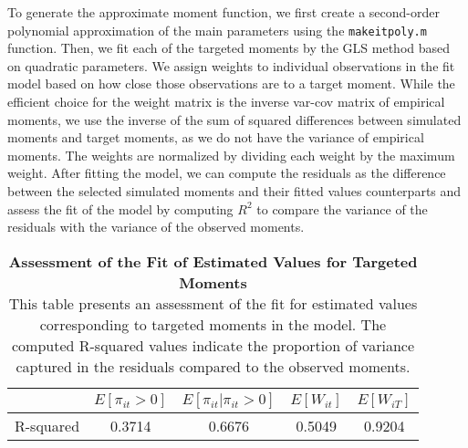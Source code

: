 \documentclass[13pt]{article}
\begin{document}
To generate the approximate moment function, we first create a second-order polynomial approximation of the main parameters using the \texttt{makeitpoly.m} function. Then, we fit each of the targeted moments by the GLS method based on quadratic parameters. We assign weights to individual observations in the fit model based on how close those observations are to a target moment. While the efficient choice for the weight matrix is the inverse var-cov matrix of empirical moments, we use the inverse of the sum of squared differences between simulated moments and target moments, as we do not have the variance of empirical moments. The weights are normalized by dividing each weight by the maximum weight. After fitting the model, we can compute the residuals as the difference between the selected simulated moments and their fitted values counterparts and assess the fit of the model by computing \(R^2\) to compare the variance of the residuals with the variance of the observed moments.
\begin{table}[!htbp]
    \centering
    \caption{\textbf{Assessment of the Fit of Estimated Values for Targeted Moments}\\
    \small{
    This table presents an assessment of the fit for estimated values corresponding to targeted moments in the model. The computed R-squared values indicate the proportion of variance captured in the residuals compared to the observed moments.
    }
    }
    \begin{tabular}{lcccc}
        \hline
        & $E[\pi_{it} > 0]$ & $E[\pi_{it}|\pi_{it} > 0]$ & $E[W_{it}]$ & $E[W_{iT}]$ \\
        \hline
        R-squared & 0.3714 & 0.6676 & 0.5049 & 0.9204 \\
        \hline
    \end{tabular}
    \label{tab:fit assessment}
\end{table}
\end{document}
